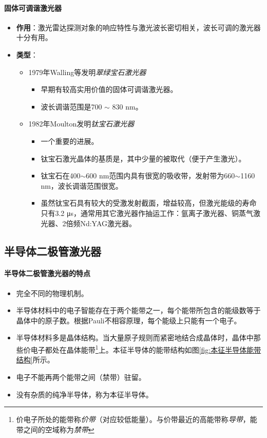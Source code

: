 \paragraph{固体可调谐激光器} 
\begin{itemize}
	\item \textbf{作用}：激光雷达探测对象的响应特性与激光波长密切相关，波长可调的激光器十分有用。
	\item \textbf{类型}：
		\begin{itemize}
			\item 1979年Walling等发明\textit{翠绿宝石激光器}
				\begin{itemize}
					\item 早期有较高实用价值的固体可调谐激光器。
					\item 波长调谐范围是700 $ \sim $ 830 nm。
				\end{itemize} %
			\item 1982年Moulton发明\textit{钛宝石激光器}
				\begin{itemize}
					\item 一个重要的进展。
					\item 钛宝石激光晶体的基质是，其中少量的被取代（便于产生激光）。
					\item 钛宝石在400$ \sim $600 nm范围内具有很宽的吸收带，发射带为660$ \sim $1160 nm，波长调谐范围很宽。
					\item 虽然钛宝石具有较大的受激发射截面，增益较高，但激光能级的寿命只有3.2 μs，通常用其它激光器作抽运工作：氩离子激光器、铜蒸气激光器、2倍频Nd:YAG激光器。
				\end{itemize}
		\end{itemize} %
\end{itemize} %

\subsection{半导体二极管激光器} %
\paragraph{半导体二极管激光器的特点}
\begin{itemize}
	\item 完全不同的物理机制。
	\item 半导体材料中的电子智能存在于两个能带之一，每个能带所包含的能级数等于晶体中的原子数。根据Pauli不相容原理，每个能级上只能有一个电子。
	\item 半导体材料多是晶体结构。当大量原子规则而紧密地结合成晶体时，晶体中那些价电子都处在晶体能带\footnote{价电子所处的能带称\textit{价带}（对应较低能量）。与价带最近的高能带称\textit{导带}，能带之间的空域称为\textit{禁带}}上。本征半导体的能带结构如图\ref{fig:本征半导体能带结构}所示。
	\item 电子不能再两个能带之间（禁带）驻留。
	\item 没有杂质的纯净半导体，称为本征半导体。
\end{itemize}

